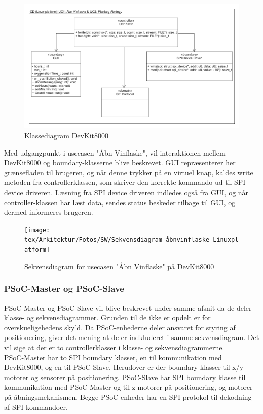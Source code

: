 \begin{figure}[H]
	\includegraphics[scale=0.4]{tex/Arkitektur/Fotos/SW/Klassediagram_Linuxplatform}
	\caption{Klassediagram DevKit8000}
\end{figure}

Med udgangpunkt i usecasen "Åbn Vinflaske", vil interaktionen mellem DevKit8000 og boundary-klasserne blive beskrevet. 
GUI repræsenterer her grænsefladen til brugeren, og når denne trykker på en virtuel knap, kaldes write metoden fra controllerklassen, som skriver den korrekte 
kommando ud til SPI device driveren. Læsning fra SPI device driveren indledes også fra GUI, og når controller-klassen har læst data, sendes status beskeder 
tilbage til GUI, og dermed informeres brugeren. \\

\begin{figure}[H]
	\texttt{[image: tex/Arkitektur/Fotos/SW/Sekvensdiagram\_åbnvinflaske\_Linuxplatform]}
	\caption{Sekvensdiagram for usecasen "Åbn Vinflaske" på DevKit8000}
\end{figure}

\subsubsection{PSoC-Master og PSoC-Slave}
PSoC-Master og PSoC-Slave vil blive beskrevet under samme afsnit da de deler klasse- og sekvensdiagrammer. 
Grunden til de ikke er opdelt er for overskueligehedens skyld. Da PSoC-enhederne deler ansvaret for styring af positionering, giver det mening at de er 
indkluderet i samme sekvensdiagram. Det vil sige at der er to controllerklasser i klasse- og sekvensdiagrammerne. \\

PSoC-Master har to SPI boundary klasser, en til kommunikation med DevKit8000, og en til PSoC-Slave. Herudover er der boundary klasser til x/y motorer og 
sensorer på positionering. 
PSoC-Slave har SPI boundary klasse til kommunikation med PSoC-Master og til z-motorer på positionering, og motorer på åbningsmekanismen. Begge PSoC-enheder har
en SPI-protokol til dekodning af SPI-kommandoer. \\

